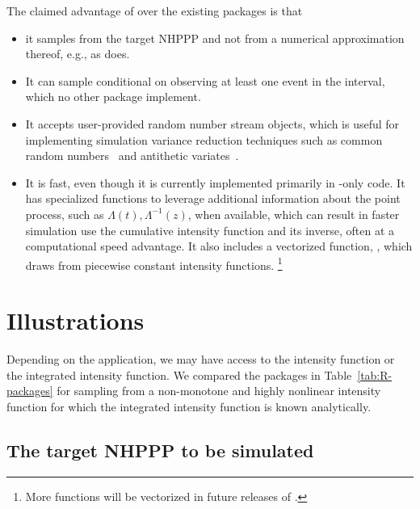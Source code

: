 \documentclass[article]{jss}\usepackage[]{graphicx}\usepackage[]{xcolor}
\newcommand{\fct}[1]{\code{#1()}}
\begin{document}
The claimed advantage of  over the existing packages is that
\begin{itemize}
\item it samples from the target NHPPP and not from a numerical approximation thereof, e.g., as  does.
\item It can  sample conditional on observing at least one event in the interval, which no other package implement.
\item It accepts user-provided random number stream objects, which is useful for implementing simulation variance reduction techniques such as common random numbers~\citep{wright1979crn} and antithetic variates~\citep{hammersley1956av}.
\item It is fast, even though it is currently implemented primarily in -only code. It has specialized functions to leverage additional information about the point process, such as $\Lambda(t), \Lambda^{-1}(z)$, when available, which can result in faster simulation  use the cumulative intensity function and its inverse, often at a computational speed advantage. It also includes a vectorized function, \fct{vdraw\_sc\_step\_regular}, which draws from piecewise constant intensity functions.%
\footnote{More functions will be vectorized in future releases of .}
\end{itemize}



\section{Illustrations} \label{sec:illustrations}

Depending on the application, we may have access to the intensity function
or the integrated intensity function.
We compared the  packages in Table~\ref{tab:R-packages} for sampling from a non-monotone and highly nonlinear intensity function for which the integrated intensity function is known analytically.

\subsection{The target NHPPP to be simulated}\label{sec:illustration-target}
\end{document}
